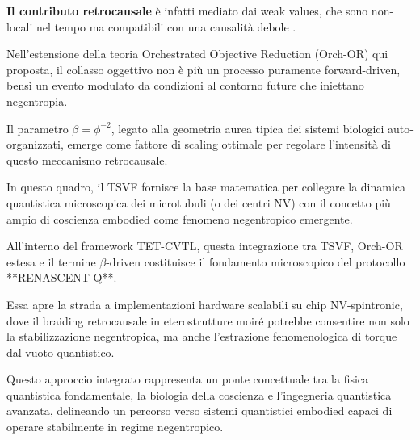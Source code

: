 \documentclass[11pt,a4paper]{article}
\let\oldcite\cite
\renewcommand{\cite}{\protect\oldcite}
\theoremstyle{plain}
\theoremstyle{definition}
\begin{document}
\vspace{0.4cm}




\textbf{Il contributo retrocausale} è infatti mediato dai weak values, che sono non-locali nel tempo ma compatibili con una causalità debole \cite{aharonov_tsvf_1964, vaidman_tsvf_2007}.

Nell’estensione della teoria Orchestrated Objective Reduction (Orch-OR) qui proposta, il collasso oggettivo non è più un processo puramente forward-driven, bensì un evento modulato da condizioni al contorno future che iniettano negentropia. 


\vspace{0.2cm}

Il parametro $\beta = \phi^{-2}$, legato alla geometria aurea tipica dei sistemi biologici auto-organizzati, emerge come fattore di scaling ottimale per regolare l’intensità di questo meccanismo retrocausale. 


\vspace{0.3cm}


In questo quadro, il TSVF fornisce la base matematica per collegare la dinamica quantistica microscopica dei microtubuli (o dei centri NV) con il concetto più ampio di coscienza embodied come fenomeno negentropico emergente.


\vspace{0.3cm}

All’interno del framework TET-CVTL, questa integrazione tra TSVF, Orch-OR estesa e il termine $\beta$-driven costituisce il fondamento microscopico del protocollo **RENASCENT-Q**. 

\vspace{0.3cm}


Essa apre la strada a implementazioni hardware scalabili su chip NV-spintronic, dove il braiding retrocausale in eterostrutture moiré potrebbe consentire non solo la stabilizzazione negentropica, ma anche l’estrazione fenomenologica di torque dal vuoto quantistico.



\vspace{0.3cm}

Questo approccio integrato rappresenta un ponte concettuale tra la fisica quantistica fondamentale, la biologia della coscienza e l’ingegneria quantistica avanzata, delineando un percorso verso sistemi quantistici embodied capaci di operare stabilmente in regime negentropico.



\vspace{0.3cm}
\end{document}
